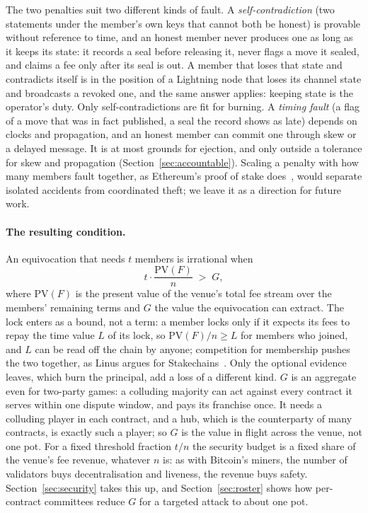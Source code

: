 \documentclass[11pt]{article}
\begin{document}
The two penalties suit two different kinds of fault. A
\emph{self-contradiction} (two statements under the member's own keys
that cannot both be honest) is provable without reference to time, and
an honest member never produces one as long as it keeps its state: it
records a seal before releasing it, never flags a move it sealed, and
claims a fee only after its seal is out. A member that loses that state
and contradicts itself is in the position of a Lightning node that
loses its channel state and broadcasts a revoked one, and the same
answer applies: keeping state is the operator's duty. Only
self-contradictions are fit for burning. A \emph{timing fault} (a flag
of a move that was in fact published, a seal the record shows as late)
depends on clocks and propagation, and an honest member can commit one
through skew or a delayed message. It is at most grounds for ejection,
and only outside a tolerance for skew and propagation
(Section~\ref{sec:accountable}). Scaling a penalty with how many
members fault together, as Ethereum's proof of stake does~\cite{ethslash},
would separate isolated accidents from coordinated theft; we leave it
as a direction for future work.

\paragraph{The resulting condition.} An equivocation that needs $t$
members is irrational when
\[
  t \cdot \frac{\mathrm{PV}(F)}{n} \;>\; G,
\]
where $\mathrm{PV}(F)$ is the present value of the venue's total fee
stream over the members' remaining terms and $G$ the value the
equivocation can extract. The lock enters as a bound, not a term: a
member locks only if it expects its fees to repay the time value $L$ of
its lock, so $\mathrm{PV}(F)/n \ge L$ for members who joined, and $L$
can be read off the chain by anyone; competition for membership pushes
the two together, as Linus argues for Stakechains~\cite{coins}. Only
the optional evidence leaves, which burn the principal, add a loss of
a different kind. $G$ is an aggregate even for two-party games:
a colluding majority can act against every contract it serves within
one dispute window, and pays its franchise once. It needs a colluding
player in each contract, and a hub, which is the counterparty of many
contracts, is exactly such a player; so $G$ is the value in flight
across the venue, not one pot. For a fixed threshold fraction $t/n$ the
security budget is a fixed share of the venue's fee revenue, whatever
$n$ is: as with Bitcoin's miners, the number of validators buys
decentralisation and liveness, the revenue buys safety.
Section~\ref{sec:security} takes this up, and
Section~\ref{sec:roster} shows how per-contract committees reduce $G$
for a targeted attack to about one pot.
\end{document}
